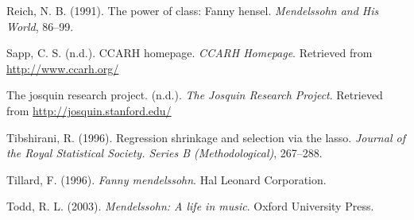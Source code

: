\documentclass[12pt,twoside]{reedthesis}
\theoremstyle{definition}
\theoremstyle{definition}
\theoremstyle{definition}
\theoremstyle{remark}
\begin{document}
\hypertarget{ref-reich1991}{}
Reich, N. B. (1991). The power of class: Fanny hensel. \emph{Mendelssohn
and His World}, 86--99.

\hypertarget{ref-sapp}{}
Sapp, C. S. (n.d.). CCARH homepage. \emph{CCARH Homepage}. Retrieved
from \url{http://www.ccarh.org/}

\hypertarget{ref-jrp}{}
The josquin research project. (n.d.). \emph{The Josquin Research
Project}. Retrieved from \url{http://josquin.stanford.edu/}

\hypertarget{ref-lasso}{}
Tibshirani, R. (1996). Regression shrinkage and selection via the lasso.
\emph{Journal of the Royal Statistical Society. Series B
(Methodological)}, 267--288.

\hypertarget{ref-tillard1996}{}
Tillard, F. (1996). \emph{Fanny mendelssohn}. Hal Leonard Corporation.

\hypertarget{ref-todd2003}{}
Todd, R. L. (2003). \emph{Mendelssohn: A life in music}. Oxford
University Press.


\end{document}
